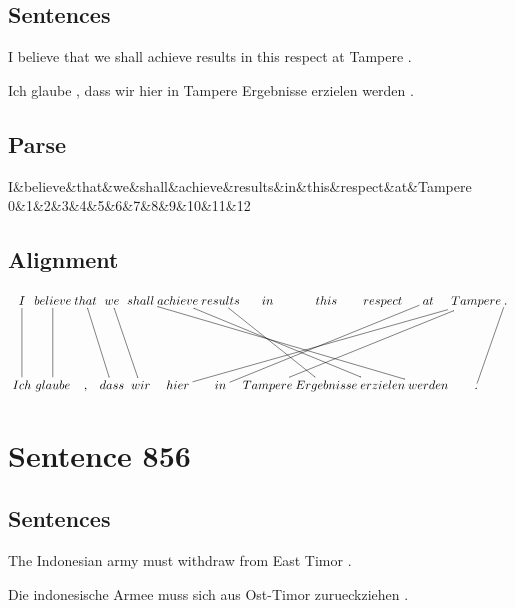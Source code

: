 \documentclass{report}
\begin{document}
\subsection*{Sentences}
I believe that we shall achieve results in this respect at Tampere .

\noindent Ich glaube , dass wir hier in Tampere Ergebnisse erzielen werden .



\subsection*{Parse}
\begin{dependency}[theme=simple]
\begin{deptext}[column sep=.5cm, row sep=.1ex]
I\&believe\&that\&we\&shall\&achieve\&results\&in\&this\&respect\&at\&Tampere\\
0\&1\&2\&3\&4\&5\&6\&7\&8\&9\&10\&11\&12\\
\end{deptext}
\end{dependency}


\subsection*{Alignment}
\scriptsize{
$
\xymatrix@C-2.3pc{
I \ar @{-} [dd] & believe \ar @{-} [dd] & that \ar @{-} [ddr] & we \ar @{-} [ddr] & shall \ar @{-} [ddrrrrrr] & achieve \ar @{-} [ddrrrr] & results \ar @{-} [ddrr] & in & this & respect & at \ar @{-} [ddllll] & Tampere \ar @{-} [ddllll] \ar @{-} [ddllllll] & . \ar @{-} [ddl]\\\\
Ich & glaube & , & dass & wir & hier & in & Tampere & Ergebnisse & erzielen & werden & .
}$}
\newpage\section*{Sentence 856}

\subsection*{Sentences}
The Indonesian army must withdraw from East Timor .

\noindent Die indonesische Armee muss sich aus Ost-Timor zurueckziehen .
\end{document}
